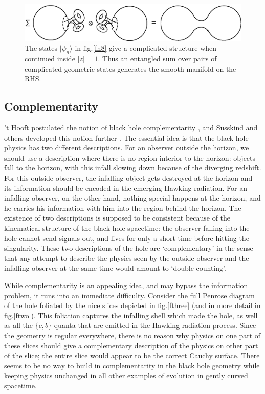 \documentclass[11pt]{article}
\begin{document}
\begin{figure}[htbp]
\begin{center}
\includegraphics[scale=.75]{fn9.eps}
\caption{{The states $|\psi_n\rangle$ in fig.\ref{fn8} give a complicated structure when continued inside $|z|=1$.  Thus an entangled sum over pairs of complicated geometric states generates the smooth manifold on the RHS.}}
\label{fn9}
\end{center}
\end{figure}

\subsection{Complementarity}

't Hooft postulated the notion of black hole complementarity \cite{thooft1}, and Susskind and others developed this notion further \cite{suss1}. The essential idea is that the black hole physics has two different descriptions. For an observer outside the horizon, we should use a description where there is no region interior to the horizon: objects fall to the horizon, with this infall slowing down because of the diverging redshift. For this outside observer, the infalling object gets destroyed at the horizon and its information should be encoded in the emerging Hawking radiation. For an infalling observer, on the other hand, nothing special happens at the horizon, and he carries his information with him into the region behind the horizon. The existence of two descriptions is supposed to be consistent because of the kinematical structure of the black hole spacetime: the observer falling into the hole cannot send signals out, and lives for only a short time before hitting the singularity. These two descriptions of the hole are `complementary' in the sense that any attempt to describe the physics seen by the outside observer and the infalling observer at the same time would amount to `double counting'. 

While complementarity is an appealing idea, and may bypass the information problem, it runs into an immediate difficulty. Consider the full Penrose diagram of the hole foliated by the nice slices depicted in fig.\ref{fthree} (and in more detail in fig.\ref{ftwo}). This foliation captures 
the infalling shell which made the hole, as well as all the $\{c, b\}$ quanta that are emitted in the Hawking radiation process. Since the geometry is regular everywhere, there is no reason why physics on one part of these slices should give a complementary description of the physics on other part of the slice; the entire slice would appear to be the correct Cauchy surface. There seems to be no way to build in complementarity in the black hole geometry while keeping physics unchanged in all other examples of evolution in gently curved spacetime.
\end{document}
